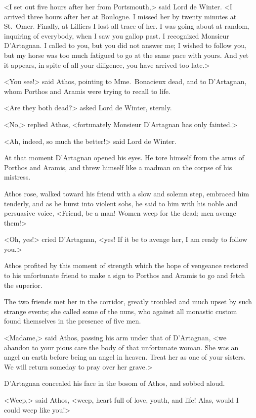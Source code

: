 <I set out five hours after her from Portsmouth,> said Lord de Winter. <I arrived three hours after her at Boulogne. I missed her by twenty minutes at St.~Omer. Finally, at Lilliers I lost all trace of her. I was going about at random, inquiring of everybody, when I saw you gallop past. I recognized Monsieur D'Artagnan. I called to you, but you did not answer me; I wished to follow you, but my horse was too much fatigued to go at the same pace with yours. And yet it appears, in spite of all your diligence, you have arrived too late.> 

<You see!> said Athos, pointing to Mme.~Bonacieux dead, and to D'Artagnan, whom Porthos and Aramis were trying to recall to life. 

<Are they both dead?> asked Lord de Winter, sternly. 

<No,> replied Athos, <fortunately Monsieur D'Artagnan has only fainted.> 

<Ah, indeed, so much the better!> said Lord de Winter. 

At that moment D'Artagnan opened his eyes. He tore himself from the arms of Porthos and Aramis, and threw himself like a madman on the corpse of his mistress. 

Athos rose, walked toward his friend with a slow and solemn step, embraced him tenderly, and as he burst into violent sobs, he said to him with his noble and persuasive voice, <Friend, be a man! Women weep for the dead; men avenge them!> 

<Oh, yes!> cried D'Artagnan, <yes! If it be to avenge her, I am ready to follow you.> 

Athos profited by this moment of strength which the hope of vengeance restored to his unfortunate friend to make a sign to Porthos and Aramis to go and fetch the superior. 

The two friends met her in the corridor, greatly troubled and much upset by such strange events; she called some of the nuns, who against all monastic custom found themselves in the presence of five men. 

<Madame,> said Athos, passing his arm under that of D'Artagnan, <we abandon to your pious care the body of that unfortunate woman. She was an angel on earth before being an angel in heaven. Treat her as one of your sisters. We will return someday to pray over her grave.> 

D'Artagnan concealed his face in the bosom of Athos, and sobbed aloud. 

<Weep,> said Athos, <weep, heart full of love, youth, and life! Alas, would I could weep like you!> 

